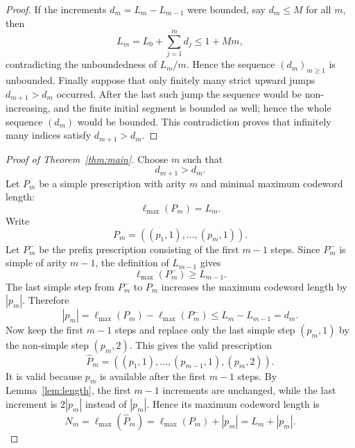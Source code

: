 \documentclass[11pt]{article}
\newcommand{\ellmax}{\ell_{\max}}
\begin{document}
\begin{proof}
If the increments $d_m=L_m-L_{m-1}$ were bounded, say $d_m\leq M$ for all $m$, then
\begin{equation}
L_m=L_0+\sum_{j=1}^{m}d_j\leq 1+Mm,
\end{equation}
contradicting the unboundedness of $L_m/m$. Hence the sequence $(d_m)_{m\geq 1}$ is unbounded. Finally suppose that only finitely many strict upward jumps $d_{m+1}>d_m$ occurred. After the last such jump the sequence would be non-increasing, and the finite initial segment is bounded as well; hence the whole sequence $(d_m)$ would be bounded. This contradiction proves that infinitely many indices satisfy $d_{m+1}>d_m$.
\end{proof}

\begin{proof}[Proof of Theorem~\ref{thm:main}]
Choose $m$ such that
\begin{equation}
d_{m+1}>d_m.
\end{equation}
Let $P_m$ be a simple prescription with arity $m$ and minimal maximum codeword length:
\begin{equation}
\ellmax(P_m)=L_m.
\end{equation}
Write
\begin{equation}
P_m=((p_1,1),\ldots,(p_m,1)).
\end{equation}
Let $P_m^-$ be the prefix prescription consisting of the first $m-1$ steps. Since $P_m^-$ is simple of arity $m-1$, the definition of $L_{m-1}$ gives
\begin{equation}
\ellmax(P_m^-)\geq L_{m-1}.
\end{equation}
The last simple step from $P_m^-$ to $P_m$ increases the maximum codeword length by $|p_m|$. Therefore
\begin{equation}
|p_m|=\ellmax(P_m)-\ellmax(P_m^-)
       \leq L_m-L_{m-1}=d_m.
\end{equation}
Now keep the first $m-1$ steps and replace only the last simple step $(p_m,1)$ by the non-simple step $(p_m,2)$. This gives the valid prescription
\begin{equation}
\widehat P_m=((p_1,1),\ldots,(p_{m-1},1),(p_m,2)).
\end{equation}
It is valid because $p_m$ is available after the first $m-1$ steps. By Lemma~\ref{lem:length}, the first $m-1$ increments are unchanged, while the last increment is $2|p_m|$ instead of $|p_m|$. Hence its maximum codeword length is
\begin{equation}
N_m=\ellmax(\widehat P_m)=\ellmax(P_m)+|p_m|=L_m+|p_m|.
\end{equation}

\end{proof}
\end{document}
